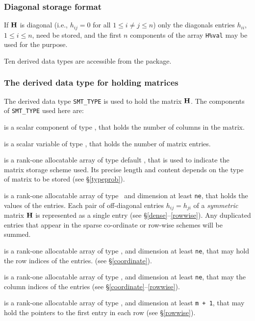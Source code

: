 \documentclass{galahad}
\begin{document}
\subsubsection{Diagonal storage format}\label{diagonal}
If ${\mathbf{H}}$ is diagonal (i.e., $h_{ij} = 0$ for all $1 \leq i \neq j \leq n$)
only the diagonals entries $h_{ii}$, $1 \leq i \leq n$,  need be stored,
and the first $n$ components of the array {\tt H\%val} may be used for 
the purpose. 





\galtypes
Ten derived data types are accessible from the package.


\subsubsection{The derived data type for holding matrices}\label{typesmt}
The derived data type {\tt SMT\_TYPE} is used to hold the matrix ${\mathbf{H}}$. 
The components of {\tt SMT\_TYPE} used here are:

\begin{description}

 is a scalar component of type \integer, 
that holds the number of columns in the matrix. 
 
 is a scalar variable of type \integer, that
holds the number of matrix entries.

 is a rank-one allocatable array of type default \character, that
is used to indicate the matrix storage scheme used. Its precise length and
content depends on the type of matrix to be stored (see \S\ref{typeprob}).

 is a rank-one allocatable array of type \realdp\, 
and dimension at least {\tt ne}, that holds the values of the entries. 
Each pair of off-diagonal entries $h_{ij} = h_{ji}$ of a {\em symmetric}
matrix ${\mathbf{H}}$ is represented as a single entry 
(see \S\ref{dense}--\ref{rowwise}).
Any duplicated entries that appear in the sparse 
co-ordinate or row-wise schemes will be summed. 

 is a rank-one allocatable array of type \integer, 
and dimension at least {\tt ne}, that may hold the row indices of the entries. 
(see \S\ref{coordinate}).

 is a rank-one allocatable array of type \integer, 
and dimension at least {\tt ne}, that may the column indices of the entries
(see \S\ref{coordinate}--\ref{rowwise}).

 is a rank-one allocatable array of type \integer, 
and dimension at least {\tt m + 1}, that may hold the pointers to
the first entry in each row (see \S\ref{rowwise}).

\end{description}
\end{document}
